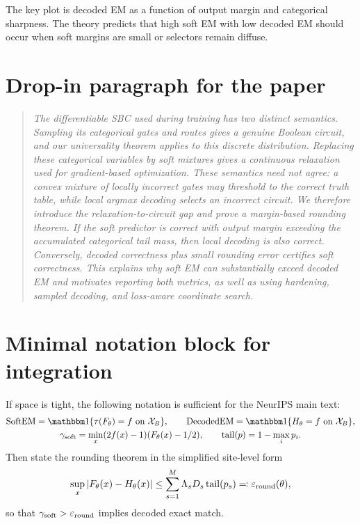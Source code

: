 \documentclass[11pt]{article}
\theoremstyle{definition}
\theoremstyle{remark}
\newcommand{\X}{\mathcal X}
\newcommand{\one}{\mathbbm 1}
\newcommand{\tail}{\operatorname{tail}}
\newcommand{\SBC}{\textnormal{\textsc{SBC}}}
\newcommand{\SoftEM}{\operatorname{SoftEM}}
\newcommand{\DecEM}{\operatorname{DecodedEM}}
\newcommand{\errround}{\varepsilon_{\rm round}}
\newcommand{\gammsoft}{\gamma_{\rm soft}}
\begin{document}
The key plot is decoded EM as a function of output margin and categorical sharpness.  The theory predicts that high soft EM with low decoded EM should occur when soft margins are small or selectors remain diffuse.

\section{Drop-in paragraph for the paper}

\begin{quote}
\emph{The differentiable \SBC{} used during training has two distinct semantics.  Sampling its categorical gates and routes gives a genuine Boolean circuit, and our universality theorem applies to this discrete distribution.  Replacing these categorical variables by soft mixtures gives a continuous relaxation used for gradient-based optimization.  These semantics need not agree: a convex mixture of locally incorrect gates may threshold to the correct truth table, while local argmax decoding selects an incorrect circuit.  We therefore introduce the relaxation-to-circuit gap and prove a margin-based rounding theorem.  If the soft predictor is correct with output margin exceeding the accumulated categorical tail mass, then local decoding is also correct.  Conversely, decoded correctness plus small rounding error certifies soft correctness.  This explains why soft EM can substantially exceed decoded EM and motivates reporting both metrics, as well as using hardening, sampled decoding, and loss-aware coordinate search.}
\end{quote}

\section{Minimal notation block for integration}

If space is tight, the following notation is sufficient for the NeurIPS main text:
\[
\begin{gathered}
\SoftEM=\one\{\tau(F_\theta)=f\text{ on }\X_B\},\qquad
\DecEM=\one\{H_\theta=f\text{ on }\X_B\},\\
\gammsoft=\min_x(2f(x)-1)(F_\theta(x)-1/2),\qquad
\tail(p)=1-\max_i p_i.
\end{gathered}
\]
Then state the rounding theorem in the simplified site-level form
\[
    \sup_x |F_\theta(x)-H_\theta(x)|
    \le
    \sum_{s=1}^M \Lambda_sD_s\tail(p_s)
    \eqqcolon \errround(\theta),
\]
so that $\gammsoft>\errround$ implies decoded exact match.
\end{document}
